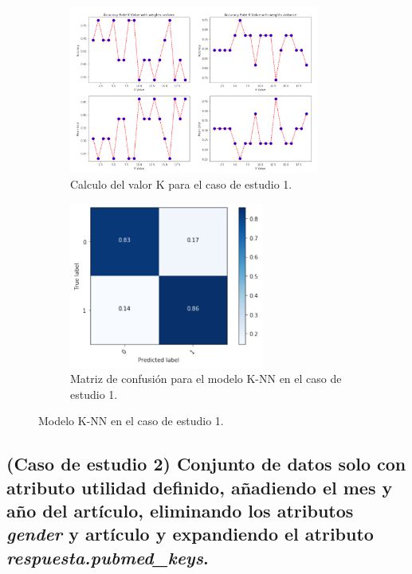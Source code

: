 \begin{figure}[!htb]
    \begin{subfigure}[b]{0.45\linewidth}
    	\centering
	    \includegraphics[width=0.9\textwidth]{images/resultados_knn_ent_conjunto1.png}
    	\caption{Calculo del valor K para el caso de estudio 1.}
		\label{knnTrainCase1}
	\end{subfigure}
	\begin{subfigure}[b]{0.45\linewidth} 
		\centering
		\includegraphics[width=0.7\textwidth]{images/resultados_knn_cm_conjunto1.png}
		\caption{Matriz de confusión para el modelo K-NN en el caso de estudio 1.}
		\label{knnCMCase1}
	\end{subfigure}
	\caption{Modelo K-NN en el caso de estudio 1.}
	\label{knnCase1}
\end{figure}

\subsection{(Caso de estudio 2) Conjunto de datos solo con atributo utilidad definido, añadiendo el mes y año del artículo, eliminando los atributos \textit{gender} y artículo y expandiendo el atributo \textit{respuesta.pubmed\_keys}.}

